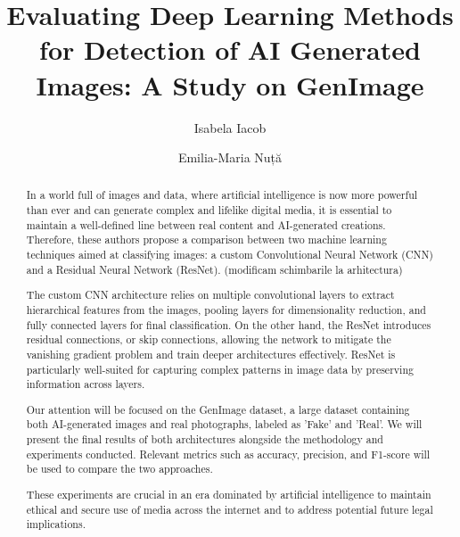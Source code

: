 \documentclass[runningheads]{llncs}
\begin{document}
%
\title{Evaluating Deep Learning Methods for Detection of AI Generated Images: A Study on GenImage}
%
%
\author{Isabela Iacob \and Emilia-Maria Nuță}
%
%
%
\maketitle              %
%
\begin{abstract}

In a world full of images and data, where artificial intelligence is now more powerful than ever and can generate complex and lifelike digital media, it is essential to maintain a well-defined line between real content and AI-generated creations. Therefore, these authors propose a comparison between two machine learning techniques aimed at classifying images: a custom Convolutional Neural Network (CNN) and a Residual Neural Network (ResNet). (modificam schimbarile la arhitectura)

The custom CNN architecture relies on multiple convolutional layers to extract hierarchical features from the images, pooling layers for dimensionality reduction, and fully connected layers for final classification. On the other hand, the ResNet introduces residual connections, or skip connections, allowing the network to mitigate the vanishing gradient problem and train deeper architectures effectively. ResNet is particularly well-suited for capturing complex patterns in image data by preserving information across layers.

Our attention will be focused on the GenImage dataset, a large dataset containing both AI-generated images and real photographs, labeled as 'Fake' and 'Real'.  We will present the final results of both architectures alongside the methodology and experiments conducted. Relevant metrics such as accuracy, precision, and F1-score will be used to compare the two approaches.

These experiments are crucial in an era dominated by artificial intelligence to maintain ethical and secure use of media across the internet and to address potential future legal implications.


\end{abstract}
%
%
\end{document}
